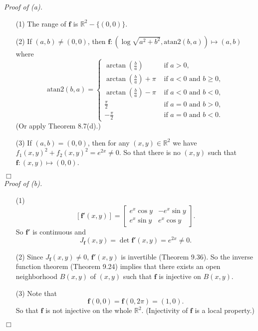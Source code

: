 \documentclass{article}
\begin{document}
\emph{Proof of (a).}
\begin{enumerate}
\item[(1)]
  The range of $\textbf{f}$ is $\mathbb{R}^2 - \{(0,0)\}$.

\item[(2)]
  If $(a,b) \neq (0,0)$,
  then
  $\mathbf{f}: \left(\log \sqrt{a^2+b^2}, \mathrm{atan2}(b,a)\right) \mapsto (a,b)$
  where
  \begin{equation*}
    \mathrm{atan2}(b,a) =
      \begin{cases}
        \arctan\left(\frac{b}{a}\right) & \text{ if $a > 0$}, \\
        \arctan\left(\frac{b}{a}\right) + \pi & \text{ if $a < 0$ and $b \geq 0$}, \\
        \arctan\left(\frac{b}{a}\right) - \pi & \text{ if $a < 0$ and $b < 0$}, \\
        \frac{\pi}{2} & \text{ if $a = 0$ and $b > 0$}, \\
        -\frac{\pi}{2} & \text{ if $a = 0$ and $b < 0$}.
      \end{cases}
  \end{equation*}
  (Or apply Theorem 8.7(d).)

\item[(3)]
  If $(a,b) = (0,0)$,
  then for any $(x,y) \in \mathbb{R}^2$
  we have
  $f_1(x,y)^2 + f_2(x,y)^2 = e^{2x} \neq 0$.
  So that there is no $(x,y)$ such that $\mathbf{f}: (x,y) \mapsto (0,0)$.
\end{enumerate}
$\Box$ \\



\emph{Proof of (b).}
\begin{enumerate}
\item[(1)]
  \[
    [\mathbf{f}'(x,y)]
    =
    \begin{bmatrix}
      e^x \cos y & -e^x \sin y \\
      e^x \sin y &  e^x \cos y
    \end{bmatrix}.
  \]
  So $\mathbf{f}'$ is continuous and
  \[
    J_{\mathbf{f}}(x,y)
    = \det \mathbf{f}'(x,y)
    = e^{2x}
    \neq 0.
  \]

\item[(2)]
  Since $J_{\mathbf{f}}(x,y) \neq 0$, $\mathbf{f}'(x,y)$ is invertible (Theorem 9.36).
  So the inverse function theorem (Theorem 9.24) implies that
  there exists an open neighborhood $B(x,y)$ of $(x,y)$ such that
  $\mathbf{f}$ is injective on $B(x,y)$.

\item[(3)]
  Note that
  \[
    \mathbf{f}(0,0) = \mathbf{f}(0,2\pi) = (1,0).
  \]
  So that $\mathbf{f}$ is not injective on the whole $\mathbb{R}^2$.
  (Injectivity of $\mathbf{f}$ is a local property.)
\end{enumerate}
$\Box$ \\
\end{document}
